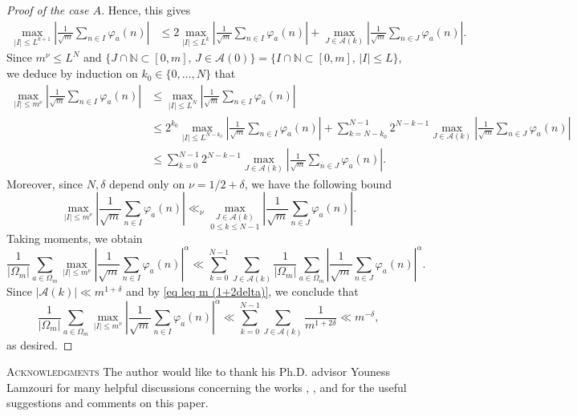 \documentclass[12pt]{amsart}
\theoremstyle{definition}
\numberwithin{equation}{section}
\numberwithin{equation}{section}
\def\A{\mathcal{A}}
\def\N{\mathbb{N}}
\begin{document}
\begin{proof}[Proof of the case $A$]
 Hence, this gives 
\begin{align*}
\max_{|I| \leq L^{k+1}}\left|\frac{1}{\sqrt{m}}\sum_{n\in I} \varphi_a(n)\right|
&\leq 2\max_{|I| \leq L^{k}}
\left|
\frac{1}{\sqrt{m}}\sum_{n\in I} \varphi_a(n)\right| +
\max_{J\in \A(k)}
\left|\frac{1}{\sqrt{m}}\sum_{n\in J} \varphi_a(n)\right|.
\end{align*}
Since $m^\nu\leq L^{N}$ and $\{J\cap\N\subset [ 0, m], \, J \in \A(0) \} = \{I\cap\N\subset [ 0, m], \, |I| \leq L \} $, we deduce by induction on \(k_0\in\{0,\dots,N\}\) that
\begin{align*}%
\max_{|I| \leq m^\nu}\left|\frac{1}{\sqrt{m}}\sum_{n\in I} \varphi_a(n)\right|
&\leq 
\max_{|I| \leq L^{N}}\left|\frac{1}{\sqrt{m}}\sum_{n\in I} \varphi_a(n)\right|\\
&\leq 2^{k_0} \max_{|I| \leq L^{N-k_0}}\left|\frac{1}{\sqrt{m}}\sum_{n\in I} \varphi_a(n)\right|
+\sum_{k =N- k_0}^{N-1}
2^{N-k-1}\max_{J\in \A(k)}
\left|\frac{1}{\sqrt{m}}\sum_{n\in J} \varphi_a(n)\right|\\
&\leq 
\sum_{k = 0}^{N-1} 2^{N-k-1}
\max_{J\in  \A(k)}
\left|\frac{1}{\sqrt{m}}\sum_{n\in J} \varphi_a(n)\right|.
\end{align*}
Moreover, since $N,\delta$ depend only on $\nu = 1/2+\delta$, we have the following bound
\begin{equation*}
\max_{|I| \leq m^\nu}\left|\frac{1}{\sqrt{m}}\sum_{n\in I} \varphi_a(n)\right|
\ll_\nu
\underset{0\leq k\leq N-1}{\max_{J\in \A(k)}}
\left|\frac{1}{\sqrt{m}}\sum_{n\in J} \varphi_a(n)\right|.
\end{equation*}
Taking moments, we obtain
\[
\frac{1}{|\Omega_m|}\sum_{a\in\Omega_m}
\max_{|I|\leq m^\nu}\left|
\frac{1}{\sqrt{m}}\sum_{n\in I} \varphi_a(n)
\right|^{\alpha } 
\ll
\sum_{k = 0}^{N-1}
\sum_{J\in \A(k)}
\frac{1}{|\Omega_m|}\sum_{a\in\Omega_m}
\left|\frac{1}{\sqrt{m}}\sum_{n\in J} \varphi_a(n)\right|^\alpha.
\] 
Since \(|\A(k)| \ll m^{1+\delta}\) and by \eqref{eq leq m (1+2delta)}, we conclude that
\[
\frac{1}{|\Omega_m|}
\sum_{a\in\Omega_m}
\max_{|I|\leq m^\nu}
\left|
\frac{1}{\sqrt{m}}\sum_{n\in I} \varphi_a(n)
\right|^{\alpha } 
\ll
\sum_{k = 0}^{N-1}
\sum_{J\in \A(k)}\frac{1}{m^{1+2\delta}}
\ll m^{-\delta},
\] as desired.
\end{proof}


\textsc{
Acknowledgments} The author would like to thank his Ph.D. advisor Youness Lamzouri for many helpful discussions concerning the works
\cite{ABL21},  \cite{Lam20},
\cite{LN24} and for the
useful suggestions and comments on this paper.
\end{document}
